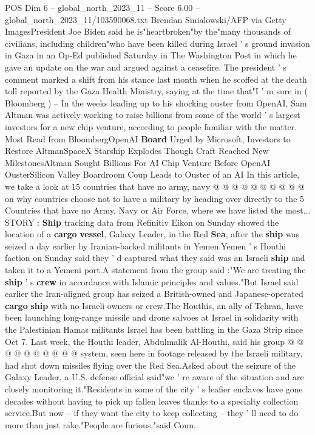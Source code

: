 \begin{textsample}{POS Dim 6 – global\_north\_2023\_11 – Score 6.00 – global\_north\_2023\_11/103590068.txt}  \label{ex:f6_pos_257}
Brendan Smialowski/AFP via Getty ImagesPresident Joe Biden said he is"heartbroken"by the"many thousands of civilians, including children"who have been killed during Israel ' s ground invasion in Gaza in an Op-Ed published Saturday in The Washington Post in which he gave an update on the war and argued against a ceasefire.
The president ' s comment marked a shift from his stance last month when he scoffed at the death toll reported by the Gaza Health Ministry, saying at the time that"I ' m sure in ( Bloomberg ) -- In the weeks leading up to his shocking ouster from OpenAI, Sam Altman was actively working to raise billions from some of the world ' s largest investors for a new chip venture, according to people familiar with the matter.
Most Read from BloombergOpenAI \textbf{Board} Urged by Microsoft, Investors to Restore AltmanSpaceX Starship Explodes Though Craft Reached New MilestonesAltman Sought Billions For AI Chip Venture Before OpenAI OusterSilicon Valley Boardroom Coup Leads to Ouster of an AI In this article, we take a look at 15 countries that have no army, navy @ @ @ @ @ @ @ @ @ @ on why countries choose not to have a military by heading over directly to the 5 Countries that have no Army, Navy or Air Force, where we have listed the most...
STORY : \textbf{Ship} tracking data from Refinitiv Eikon on Sunday showed the location of a \textbf{cargo} \textbf{vessel}, Galaxy Leader, in the Red \textbf{Sea}, after the \textbf{ship} was seized a day earlier by Iranian-backed militants in Yemen.Yemen ' s Houthi faction on Sunday said they ' d captured what they said was an Israeli \textbf{ship} and taken it to a Yemeni port.A statement from the group said :"We are treating the \textbf{ship} ' s \textbf{crew} in accordance with Islamic principles and values."But Israel said earlier the Iran-aligned group has seized a British-owned and Japanese-operated \textbf{cargo} \textbf{ship} with no Israeli owners or crew.The Houthis, an ally of Tehran, have been launching long-range missile and drone salvoes at Israel in solidarity with the Palestinian Hamas militants Israel has been battling in the Gaza Strip since Oct 7.
Last week, the Houthi leader, Abdulmalik Al-Houthi, said his group @ @ @ @ @ @ @ @ @ @ system, seen here in footage released by the Israeli military, had shot down missiles flying over the Red Sea.Asked about the seizure of the Galaxy Leader, a U.S. defense official said"we ' re aware of the situation and are closely monitoring it."Residents in some of the city ' s leafier enclaves have gone decades without having to pick up fallen leaves thanks to a specialty collection service.But now -- if they want the city to keep collecting -- they ' ll need to do more than just rake."People are furious,"said Coun.

\end{textsample}
